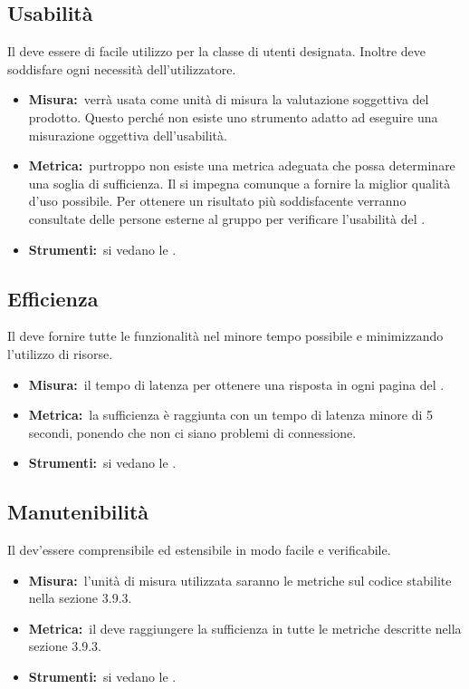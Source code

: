 \subsection{Usabilità}
Il  deve essere di facile utilizzo per la classe di utenti designata. Inoltre deve soddisfare ogni necessità dell'utilizzatore.
\begin{itemize}
\item \textbf{Misura:}\ verrà usata come unità di misura la valutazione soggettiva del prodotto. Questo perché non esiste uno strumento adatto ad eseguire una misurazione oggettiva dell'usabilità.
\item \textbf{Metrica:}\ purtroppo non esiste una metrica adeguata che possa determinare una soglia di sufficienza. Il  si impegna comunque a fornire la miglior qualità d'uso possibile. Per ottenere un risultato più soddisfacente verranno consultate delle persone esterne al gruppo per verificare l'usabilità del . 
\item \textbf{Strumenti:}\ si vedano le \NPdoc.
\end{itemize}

\subsection{Efficienza}
Il  deve fornire tutte le funzionalità nel minore tempo possibile e minimizzando l'utilizzo di risorse.
\begin{itemize}
\item \textbf{Misura:}\ il tempo di latenza per ottenere una risposta in ogni pagina del .
\item \textbf{Metrica:}\ la sufficienza è raggiunta con un tempo di latenza minore di 5 secondi, ponendo che non ci siano problemi di connessione.
\item \textbf{Strumenti:}\ si vedano le \NPdoc.
\end{itemize}

\subsection{Manutenibilità}
Il  dev'essere comprensibile ed estensibile in modo facile e verificabile.
\begin{itemize}
\item \textbf{Misura:}\ l'unità di misura utilizzata saranno le metriche sul codice stabilite nella sezione 3.9.3.
\item \textbf{Metrica:}\ il  deve raggiungere la sufficienza in tutte le metriche descritte nella sezione 3.9.3.
\item \textbf{Strumenti:}\ si vedano le \NPdoc.
\end{itemize}


